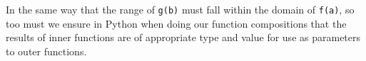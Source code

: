 In the same way that the range of \texttt{g(b)} must fall within the domain   of \texttt{f(a)}, so too must we ensure in Python when doing our function   compositions that the results of inner functions are of appropriate   type and value for use as parameters to outer functions.
% 
% 
% 
% 
% 
% 
% 
% 

